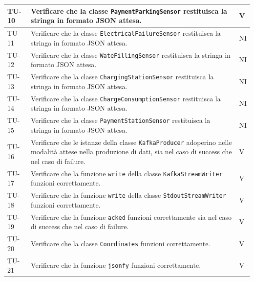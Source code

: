 \documentclass[8pt]{article}
\begin{document}
\begin{longtable}{|>{\centering}p{2cm}|>{\RaggedRight}m{12cm}|>{\centering\arraybackslash}p{2cm}|}
    TU-10 & Verificare che la classe \verb|PaymentParkingSensor| restituisca la stringa in formato JSON attesa. & V \\
    \hline

    TU-11 & Verificare che la classe \verb|ElectricalFailureSensor| restituisca la stringa in formato JSON attesa. & NI \\
    \hline
    
    TU-12 & Verificare che la classe \verb|WateFillingSensor| restituisca la stringa in formato JSON attesa. & NI \\
    \hline

    TU-13 & Verificare che la classe \verb|ChargingStationSensor| restituisca la stringa in formato JSON attesa. & NI \\
    \hline

    TU-14 & Verificare che la classe \verb|ChargeConsumptionSensor| restituisca la stringa in formato JSON attesa. & NI \\
    \hline

    TU-15 & Verificare che la classe \verb|PaymentStationSensor| restituisca la stringa in formato JSON attesa. & NI \\
    \hline
    
    TU-16 & Verificare che le istanze della classe \verb|KafkaProducer| adoperino nelle modalità attese nella produzione di dati, sia nel caso di success che nel caso di failure. & V \\
    \hline

    TU-17 & Verificare che la funzione \verb|write| della classe \verb|KafkaStreamWriter| funzioni correttamente. & V \\
    \hline

    TU-18 & Verificare che la funzione \verb|write| della classe
    \verb|StdoutStreamWriter| funzioni correttamente. & V \\
    \hline

    TU-19 & Verificare che la funzione \verb|acked| funzioni correttamente sia nel caso di success che nel caso di failure. & V \\
    \hline

    TU-20 & Verificare che la classe \verb|Coordinates| funzioni correttamente. & V \\
    \hline

    TU-21 & Verificare che la funzione \verb|jsonfy| funzioni correttamente. & V \\
    \hline

\end{longtable}
\clearpage
\end{document}
